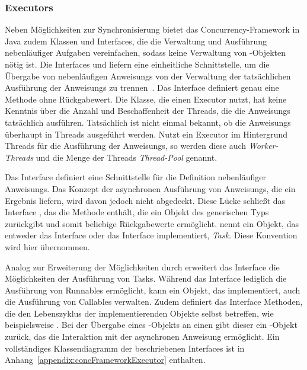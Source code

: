 \subsubsection{Executors}\label{sec:executor} Neben Möglichkeiten zur Synchronisierung bietet das Concurrency-Framework in Java zudem Klassen und Interfaces, die die Verwaltung und Ausführung nebenläufiger Aufgaben vereinfachen, sodass keine Verwaltung von \classThread{}-Objekten nötig ist. Die Interfaces \classExecutor{} und \classExecutorService{} liefern eine einheitliche Schnittstelle, um die Übergabe von nebenläufigen \glspl{Anweisung} von der Verwaltung der tatsächlichen Ausführung der \glspl{Anweisung} zu trennen~\cite[S.~70~\psqq]{Friesen2015}. Das Interface \classExecutor{} definiert genau eine Methode  ohne Rückgabewert. Die Klasse, die einen Executor nutzt, hat keine Kenntnis über die Anzahl und Beschaffenheit der Threads, die die \glspl{Anweisung} tatsächlich ausführen. Tatsächlich ist nicht einmal bekannt, ob die \glspl{Anweisung} überhaupt in Threads ausgeführt werden. Nutzt ein Executor im Hintergrund Threads für die Ausführung der \glspl{Anweisung}, so werden diese auch \emph{Worker-Threads} und die Menge der Threads \emph{Thread-Pool} genannt.

Das Interface \classRunnable{} definiert eine Schnittstelle für die Definition nebenläufiger \glspl{Anweisung}. Das Konzept der asynchronen Ausführung von \glspl{Anweisung}, die ein Ergebnis liefern, wird davon jedoch nicht abgedeckt. Diese Lücke schließt das Interface \classCallable[<V>], das die Methode  enthält, die ein Objekt des generischen Typs  zurückgibt und somit beliebige Rückgabewerte ermöglicht. \textcite{Friesen2015} nennt ein Objekt, das entweder das Interface \classRunnable{} oder das Interface \classCallable{} implementiert, \emph{Task}. Diese Konvention wird hier übernommen. 

Analog zur Erweiterung der Möglichkeiten durch \classCallable{} erweitert das Interface \classExecutorService{} die Möglichkeiten der Ausführung von Tasks. Während das Interface \classExecutor{} lediglich die Ausführung von Runnables ermöglicht, kann ein Objekt, das \classExecutorService{} implementiert, auch die Ausführung von Callables verwalten. Zudem definiert das Interface Methoden, die den Lebenszyklus der implementierenden Objekte selbst betreffen, wie beispielsweise . Bei der Übergabe eines -Objekts an einen \classExecutorService{} gibt dieser ein \classFuture[<V>]-Objekt zurück, das die Interaktion mit der asynchronen \gls{Anweisung} ermöglicht. Ein vollständiges Klassendiagramm der beschriebenen Interfaces ist in Anhang~\vref{appendix:concFrameworkExecutor} enthalten.

